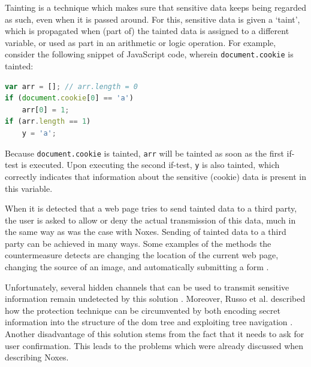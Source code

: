 Tainting is a technique which makes sure that sensitive data keeps being regarded as such, even when it is passed around. For this, sensitive data is given a `taint', which is propagated when (part of) the tainted data is assigned to a different variable, or used as part in an arithmetic or logic operation. For example, consider the following snippet of JavaScript code, wherein \texttt{document.cookie} is tainted:
\begin{lstlisting}[language=JavaScript]
var arr = []; // arr.length = 0
if (document.cookie[0] == 'a')
    arr[0] = 1;
if (arr.length == 1)
    y = 'a';
\end{lstlisting}
Because \texttt{document.cookie} is tainted, \texttt{arr} will be tainted as soon as the first if-test is executed. Upon executing the second if-test, \texttt{y} is also tainted, which correctly indicates that information about the sensitive (cookie) data is present in this variable.

When it is detected that a web page tries to send tainted data to a third party, the user is asked to allow or deny the actual transmission of this data, much in the same way as was the case with Noxes. Sending of tainted data to a third party can be achieved in many ways. Some examples of the methods the countermeasure detects are changing the location of the current web page, changing the source of an image, and automatically submitting a form \cite{Vogt2007}.

Unfortunately, several hidden channels that can be used to transmit sensitive information remain undetected by this solution \cite{Nikiforakis2010}. Moreover, Russo et al. described how the protection technique can be circumvented by both encoding secret information into the structure of the \gls{dom} tree and exploiting tree navigation \cite{Russo2009}. Another disadvantage of this solution stems from the fact that it needs to ask for user confirmation. This leads to the problems which were already discussed when describing Noxes.


